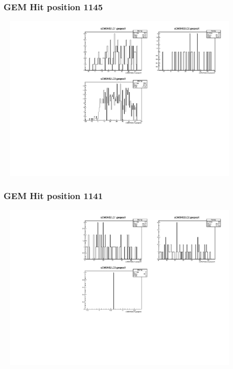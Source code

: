 \documentclass[slidestop,compress,mathserif]{beamer}
\begin{document}
\begin{frame}\frametitle{GEM Hit position 1145}
	 \includegraphics[width=12cm,height=8cm]{GEM_Hit_position_1145.pdf}
\end{frame}
\begin{frame}\frametitle{GEM Hit position 1141}
	 \includegraphics[width=12cm,height=8cm]{GEM_Hit_position_1141.pdf}
\end{frame}
\end{document}
